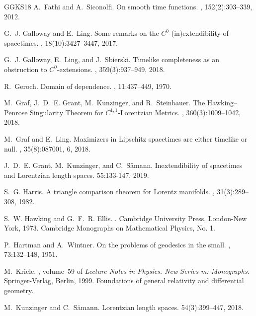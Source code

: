 \documentclass[reqno]{amsart}
\numberwithin{equation}{section}
\theoremstyle{plain}
\theoremstyle{definition}
\theoremstyle{remark}
\begin{document}
\begin{thebibliography}{GGKS18}
A.~Fathi and A.~Siconolfi.
\newblock On smooth time functions.
, 152(2):303--339, 2012.

G.~J. Galloway and E.~Ling.
\newblock Some remarks on the {$C^0$}-(in)extendibility of spacetimes.
, 18(10):3427--3447, 2017.

G.~J. Galloway, E.~Ling, and J.~Sbierski.
\newblock Timelike completeness as an obstruction to {$C^0$}-extensions.
, 359(3):937--949, 2018.

R.~Geroch.
\newblock Domain of dependence.
, 11:437--449, 1970.

M.~Graf, J.~D.~E. Grant, M.~Kunzinger, and R.~Steinbauer.
\newblock The {H}awking--{P}enrose {S}ingularity {T}heorem for
  {$C^{1,1}$}-{L}orentzian {M}etrics.
, 360(3):1009--1042, 2018.

M.~Graf and E.~Ling.
\newblock Maximizers in {L}ipschitz spacetimes are either timelike or null.
, 35(8):087001, 6, 2018.

J.~D.~E. Grant, M.~Kunzinger, and C.~S{\"a}mann.
\newblock Inextendibility of spacetimes and {L}orentzian length spaces.
 55:133-147, 2019.
 

S.~G. Harris.
\newblock A triangle comparison theorem for {L}orentz manifolds.
, 31(3):289--308, 1982.

S.~W. Hawking and G.~F.~R. Ellis.
.
\newblock Cambridge University Press, London-New York, 1973.
\newblock Cambridge Monographs on Mathematical Physics, No. 1.

P.~Hartman and A.~Wintner.
\newblock On the problems of geodesics in the small.
, 73:132--148, 1951.

M.~Kriele.
, volume~59 of {\em Lecture Notes in Physics. New
  Series m: Monographs}.
\newblock Springer-Verlag, Berlin, 1999.
\newblock Foundations of general relativity and differential geometry.

M.~Kunzinger and C.~S\"amann.
\newblock Lorentzian length spaces.
 54(3):399--447, 2018.


\end{thebibliography}
\end{document}
